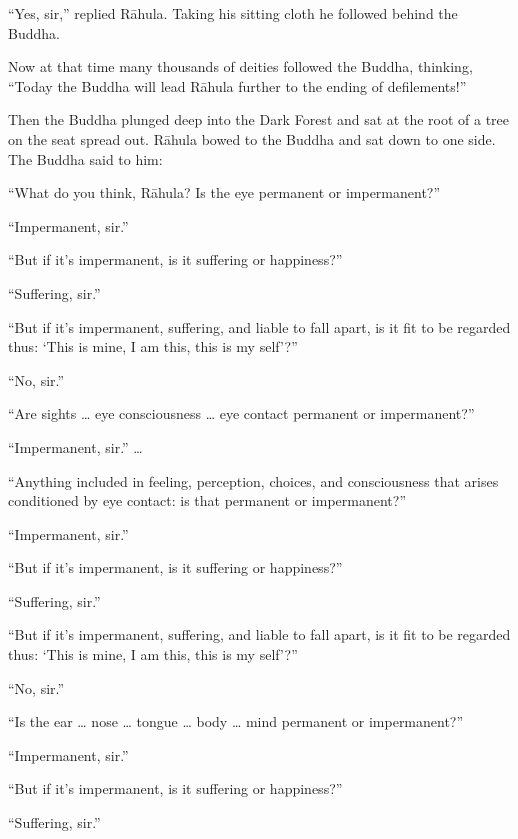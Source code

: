 \documentclass[12pt,openany]{book}%
\begin{document}
“Yes, sir,” replied \textsanskrit{Rāhula}. Taking his sitting cloth he followed behind the Buddha. 

Now at that time many thousands of deities followed the Buddha, thinking, “Today the Buddha will lead \textsanskrit{Rāhula} further to the ending of defilements!” 

Then the Buddha plunged deep into the Dark Forest and sat at the root of a tree on the seat spread out. \textsanskrit{Rāhula} bowed to the Buddha and sat down to one side. The Buddha said to him: 

“What do you think, \textsanskrit{Rāhula}? Is the eye permanent or impermanent?” 

“Impermanent, sir.” 

“But if it’s impermanent, is it suffering or happiness?” 

“Suffering, sir.” 

“But if it’s impermanent, suffering, and liable to fall apart, is it fit to be regarded thus: ‘This is mine, I am this, this is my self’?” 

“No, sir.” 

“Are sights … eye consciousness … eye contact permanent or impermanent?” 

“Impermanent, sir.” … 

“Anything included in feeling, perception, choices, and consciousness that arises conditioned by eye contact: is that permanent or impermanent?” 

“Impermanent, sir.” 

“But if it’s impermanent, is it suffering or happiness?” 

“Suffering, sir.” 

“But if it’s impermanent, suffering, and liable to fall apart, is it fit to be regarded thus: ‘This is mine, I am this, this is my self’?” 

“No, sir.” 

“Is the ear … nose … tongue … body … mind permanent or impermanent?” 

“Impermanent, sir.” 

“But if it’s impermanent, is it suffering or happiness?” 

“Suffering, sir.” 
\end{document}

